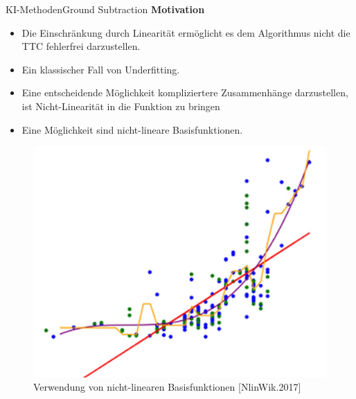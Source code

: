 \documentclass[169, handout	]{THIbeamer} %
\begin{document}
\begin{frame}{KI-Methoden}{Ground Subtraction}
	\small		
	\textbf{Motivation}
	\footnotesize
	\begin{itemize}
		\item Die Einschränkung durch Linearität ermöglicht es dem Algorithmus nicht die TTC fehlerfrei darzustellen.
		\item Ein klassischer Fall von Underfitting.
		\item Eine entscheidende Möglichkeit kompliziertere Zusammenhänge darzustellen, ist Nicht-Linearität in die Funktion zu bringen
		\item Eine Möglichkeit sind nicht-lineare Basisfunktionen. 
	\end{itemize}					
	\begin{figure}
		\includegraphics[scale=0.45]{required/Nicht_lineare_Regression.jpg}
		\caption{\scriptsize Verwendung von nicht-linearen Basisfunktionen [NlinWik.2017]}
		\label{Over and Underfitting}
	\end{figure}
\end{frame}
\end{document}
